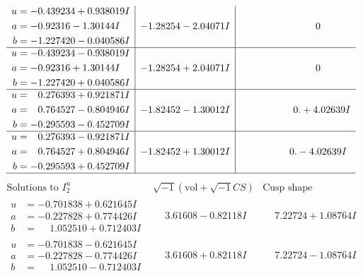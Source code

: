 \documentclass[1p]{elsarticle_modified}
\theoremstyle{definition}
\newcommand{\I}{\sqrt{-1}}
\begin{document}
$$\begin{array}{c|c|c}
\begin{aligned}
u &= -0.439234 + 0.938019 I \\
a &= -0.92316 - 1.30144 I \\
b &= -1.227420 - 0.040586 I\end{aligned}
 & -1.28254 - 2.04071 I & \phantom{-0.000000 } 0 \\ \hline\begin{aligned}
u &= -0.439234 - 0.938019 I \\
a &= -0.92316 + 1.30144 I \\
b &= -1.227420 + 0.040586 I\end{aligned}
 & -1.28254 + 2.04071 I & \phantom{-0.000000 } 0 \\ \hline\begin{aligned}
u &= \phantom{-}0.276393 + 0.921871 I \\
a &= \phantom{-}0.764527 - 0.804946 I \\
b &= -0.295593 - 0.452709 I\end{aligned}
 & -1.82452 - 1.30012 I & \phantom{-0.000000 -}0. + 4.02639 I \\ \hline\begin{aligned}
u &= \phantom{-}0.276393 - 0.921871 I \\
a &= \phantom{-}0.764527 + 0.804946 I \\
b &= -0.295593 + 0.452709 I\end{aligned}
 & -1.82452 + 1.30012 I & \phantom{-0.000000 } 0. - 4.02639 I\\
 \hline 
 \end{array}$$\newpage$$\begin{array}{c|c|c}  
\text{Solutions to }I^u_{2}& \I (\text{vol} + \sqrt{-1}CS) & \text{Cusp shape}\\
 \hline 
\begin{aligned}
u &= -0.701838 + 0.621645 I \\
a &= -0.227828 + 0.774426 I \\
b &= \phantom{-}1.052510 + 0.712403 I\end{aligned}
 & \phantom{-}3.61608 - 0.82118 I & \phantom{-}7.22724 + 1.08764 I \\ \hline\begin{aligned}
u &= -0.701838 - 0.621645 I \\
a &= -0.227828 - 0.774426 I \\
b &= \phantom{-}1.052510 - 0.712403 I\end{aligned}
 & \phantom{-}3.61608 + 0.82118 I & \phantom{-}7.22724 - 1.08764 I \\ \hline\begin{aligned}

\end{aligned}
\end{array}$$
\end{document}
